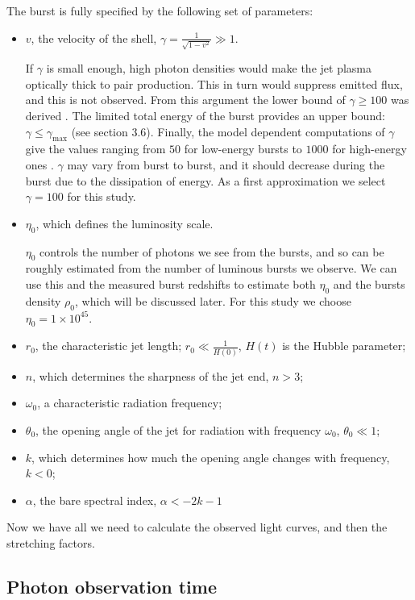 \documentclass{article}
\begin{document}
The burst is fully specified by the following set of parameters:
\begin{itemize}
\item{$v$, the velocity of the shell, $\gamma = \frac{1}{\sqrt{1-v^2}} \gg 1$.

	If $\gamma$ is small enough, high photon densities would make the jet plasma optically thick to pair production. This in turn would suppress emitted flux, and this is not observed. From this argument the lower bound of $\gamma \ge 100$ was derived \cite{}. The limited total energy of the burst provides an upper bound: $\gamma \le \gamma_\text{max}$ (see section 3.6). Finally, the model dependent computations of $\gamma$ give the values ranging from $50$ for low-energy bursts to $1000$ for high-energy ones \cite{Ghirlanda:2011ux,Ghisellini:2012nc}. $\gamma$ may vary from burst to burst, and it should decrease during the burst due to the dissipation of energy. As a first approximation we select {\boldmath$\gamma = 100$} for this study.
}
\item{$\eta_0$, which defines the luminosity scale.
	
	$\eta_0$ controls the number of photons we see from the bursts, and so can be roughly estimated from the number of luminous bursts we observe. We can use this and the measured burst redshifts to estimate both $\eta_0$ and the bursts density $\rho_0$, which will be discussed later. For this study we choose {\boldmath$\eta_0 = 1 \times 10^{45}$}.
}
\item{$r_0$, the characteristic jet length; $r_0 \ll \frac{1}{H\left(0\right)}$, $H\left(t\right)$ is the Hubble parameter;}
\item{$n$, which determines the sharpness of the jet end, $n > 3$;}
\item{$\omega_0$, a characteristic radiation frequency;}
\item{$\theta_0$, the opening angle of the jet for radiation with frequency $\omega_0$, $\theta_0 \ll 1$;}
\item{$k$, which determines how much the opening angle changes with frequency, $k < 0$;}
\item{$\alpha$, the bare spectral index, $\alpha < -2k - 1$}
\end{itemize}

Now we have all we need to calculate the observed light curves, and then the stretching factors.

\subsection{Photon observation time}
\end{document}
